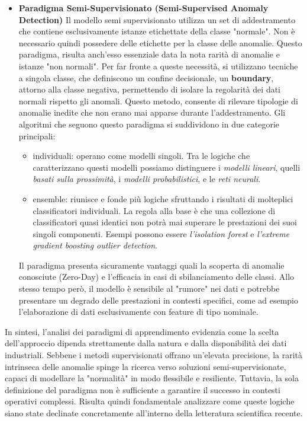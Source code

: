 \begin{itemize}
    \item \textbf{Paradigma Semi-Supervisionato (Semi-Supervised Anomaly Detection)}
    Il modello semi supervisionato utilizza un set di addestramento che contiene esclusivamente istanze etichettate della classe "normale". Non è necessario quindi possedere delle etichette per la classe delle anomalie.
    Questo paradigma, risulta anch'esso essenziale data la nota rarità di anomalie e istanze "non normali".
    Per far fronte a queste necessità, si utilizzano tecniche a singola classe, che definiscono un confine decisionale, un \textbf{boundary}, attorno alla classe negativa, permettendo di isolare la regolarità dei dati normali rispetto gli anomali.
    Questo metodo, consente di rilevare tipologie di anomalie inedite che non erano mai apparse durante l'addestramento.
    Gli algoritmi che seguono questo paradigma si suddividono in due categorie principali:
    \begin{itemize}
        \item individuali: operano come modelli singoli. Tra le logiche che caratterizzano questi modelli possiamo distinguere i \textit{modelli lineari}, quelli \textit{basati sulla prossimità}, i \textit{modelli probabilistici}, e le \textit{reti neurali}.
        \item ensemble: riunisce e fonde più logiche sfruttando i risultati di molteplici classificatori individuali. La regola alla base è che una collezione di classificatori quasi identici non potrà mai superare le prestazioni dei suoi singoli componenti. Esempi possono essere \textit{l'isolation forest} e \textit{l'extreme gradient boosting outlier detection}.
    \end{itemize}
    Il paradigma presenta sicuramente vantaggi quali la scoperta di anomalie conosciute (Zero-Day) e l'efficacia in casi di sbilanciamento delle classi. Allo stesso tempo però, il modello è sensibile al "rumore" nei dati e potrebbe presentare un degrado delle prestazioni in contesti specifici, come ad esempio l'elaborazione di dati esclusivamente con feature di tipo nominale.\cite{Perez_et_al._2021}
\end{itemize}
\vspace{1em}

In sintesi, l'analisi dei paradigmi di apprendimento evidenzia come la scelta dell'approccio dipenda strettamente dalla natura e dalla disponibilità dei dati industriali. Sebbene i metodi supervisionati offrano un'elevata precisione, la rarità intrinseca delle anomalie spinge la ricerca verso soluzioni semi-supervisionate, capaci di modellare la "normalità" in modo flessibile e resiliente. Tuttavia, la sola definizione del paradigma non è sufficiente a garantire il successo in contesti operativi complessi. Risulta quindi fondamentale analizzare come queste logiche siano state declinate concretamente all'interno della letteratura scientifica recente. 


